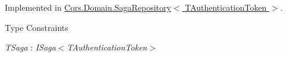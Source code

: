 Implemented in \hyperlink{classCqrs_1_1Domain_1_1SagaRepository_a84cae424cb01de22864ae7d960007cd0_a84cae424cb01de22864ae7d960007cd0}{Cqrs.\+Domain.\+Saga\+Repository$<$ T\+Authentication\+Token $>$}.

\begin{Desc}
\item[Type Constraints]\begin{description}
\item[{\em T\+Saga} : {\em I\+Saga$<$T\+Authentication\+Token$>$}]\end{description}
\end{Desc}
